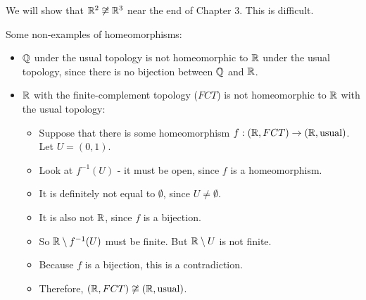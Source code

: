 We will show that $\mathbb R^2 \not\cong \mathbb R^3$ near the end of Chapter 3. This is difficult. 
\begin{example}
	Some non-examples of homeomorphisms: 
\end{example}
\begin{itemize}
	\item $\mathbb Q$ under the usual topology is not homeomorphic to $\mathbb R$ under the usual topology, since there is no bijection between $\mathbb Q$ and $\mathbb R$. 
	\item $\mathbb R$ with the finite-complement topology ($FCT$) is not homeomorphic to $\mathbb R$ with the usual topology: 
	\begin{itemize}
		\item Suppose that there is some homeomorphism $f:(\mathbb R, FCT)\to(\mathbb R,\text{usual})$. Let $U = (0,1)$. 
		\item Look at $f^{-1}(U)$ - it must be open, since $f$ is a homeomorphism. 
		\item It is definitely not equal to $\emptyset$, since $U\ne\emptyset$. 
		\item It is also not $\mathbb R$, since $f$ is a bijection. 
		\item So $\mathbb R\setminus f^{-1}(U)$ must be finite. But $\mathbb R\setminus U$ is not finite. 
		\item Because $f$ is a bijection, this is a contradiction. 
		\item Therefore, $(\mathbb R, FCT) \not\cong (\mathbb R, \text{usual})$. 
	\end{itemize}
\end{itemize}
